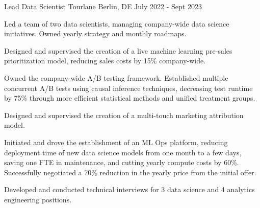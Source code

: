 \begin{section}[Experience]
  \entry%
    {Lead Data Scientist} %
    {Tourlane} %
    {Berlin, DE} %
    {July 2022 - Sept 2023} %
    {%
    \begin{entrylist}
      \item Led a team of two data scientists, managing company-wide data science initiatives. Owned yearly strategy and monthly roadmaps.
      \item Designed and supervised the creation of a live machine learning pre-sales prioritization model, reducing sales costs by 15\% company-wide.
      \item Owned the company-wide A/B testing framework. Established multiple concurrent A/B tests using causal inference techniques, decreasing test runtime by 75\% through more efficient statistical methods and unified treatment groups.
      \item Designed and supervised the creation of a multi-touch marketing attribution model.
      \item Initiated and drove the establishment of an ML Ops platform, reducing deployment time of new data science models from one month to a few days, saving one FTE in maintenance, and cutting yearly compute costs by 60\%. Successfully negotiated a 70\% reduction in the yearly price from the initial offer.
      \item Developed and conducted technical interviews for 3 data science and 4 analytics engineering positions.
    \end{entrylist}
    }%


\end{section}
